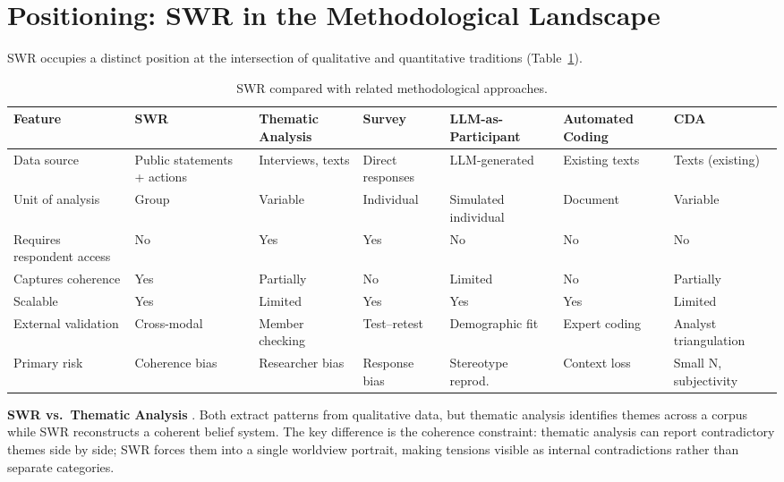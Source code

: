 \documentclass[11pt,a4paper]{article}
\begin{document}
\section{Positioning: SWR in the Methodological Landscape}
\label{sec:positioning}

SWR occupies a distinct position at the intersection of qualitative and quantitative traditions (Table~\ref{tab:comparison}).

\begin{table}[htbp]
  \centering
  \caption{SWR compared with related methodological approaches.}
  \label{tab:comparison}
  \scriptsize
  \begin{tabular}{@{} p{2.2cm} p{1.7cm} p{1.7cm} p{1.7cm} p{1.7cm} p{1.7cm} p{1.7cm} @{}}
    \toprule
    \textbf{Feature} & \textbf{SWR} & \textbf{Thematic Analysis} & \textbf{Survey} & \textbf{LLM-as-Participant} & \textbf{Auto\-mated Coding} & \textbf{CDA} \\
    \midrule
    Data source & Public state\-ments + actions & Interviews, texts & Direct responses & LLM-generated & Existing texts & Texts (existing) \\[3pt]
    Unit of analysis & Group & Variable & Individual & Simulated individual & Document & Variable \\[3pt]
    Requires respondent access & No & Yes & Yes & No & No & No \\[3pt]
    Captures coherence & Yes & Partially & No & Limited & No & Partially \\[3pt]
    Scalable & Yes & Limited & Yes & Yes & Yes & Limited \\[3pt]
    External validation & Cross-modal & Member checking & Test--retest & Demographic fit & Expert coding & Analyst triangulation \\[3pt]
    Primary risk & Coherence bias & Researcher bias & Response bias & Stereotype reprod. & Context loss & Small N, subjectivity \\
    \bottomrule
  \end{tabular}
\end{table}

\textbf{SWR vs.\ Thematic Analysis} \citep{Braun2006}. Both extract patterns from qualitative data, but thematic analysis identifies themes across a corpus while SWR reconstructs a coherent belief system. The key difference is the coherence constraint: thematic analysis can report contradictory themes side by side; SWR forces them into a single worldview portrait, making tensions visible as internal contradictions rather than separate categories.
\end{document}

